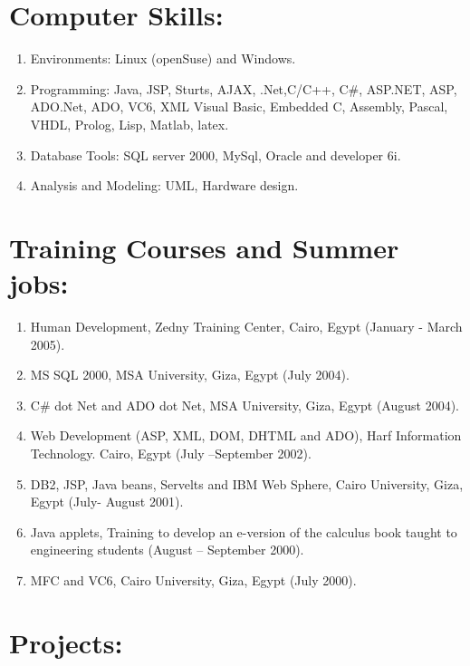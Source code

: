 \documentclass{article}
\begin{document}
 \section*{Computer Skills:}
 \begin{enumerate}
\item Environments: Linux (openSuse) and Windows.
 \item Programming: Java, JSP, Sturts, AJAX, .Net,C/C++, C\#,  ASP.NET, ASP, ADO.Net, ADO, VC6,  XML  Visual Basic, Embedded C, Assembly, Pascal, VHDL, Prolog, Lisp, Matlab, latex.
 \item Database Tools: SQL server 2000, MySql, Oracle and developer 6i.
 \item Analysis and Modeling: UML, Hardware design.
\end{enumerate}



 \section*{Training Courses and Summer jobs:}
 \begin{enumerate}
\item Human Development, Zedny Training Center, Cairo, Egypt (January - March 2005).
 \item MS SQL 2000, MSA University, Giza, Egypt (July 2004).
 \item C\# dot Net and ADO dot Net, MSA University, Giza, Egypt (August 2004).
 \item Web Development (ASP, XML, DOM, DHTML and ADO), Harf Information Technology. Cairo, Egypt (July --September 2002).
 \item DB2, JSP, Java beans, Servelts and IBM Web Sphere, Cairo University, Giza, Egypt (July- August 2001).
 \item Java applets, Training to develop an e-version of the calculus book
 taught to engineering students (August -- September 2000).
 \item MFC and VC6, Cairo University, Giza, Egypt (July 2000).
\end{enumerate}



 \section*{Projects:}
\end{document}
